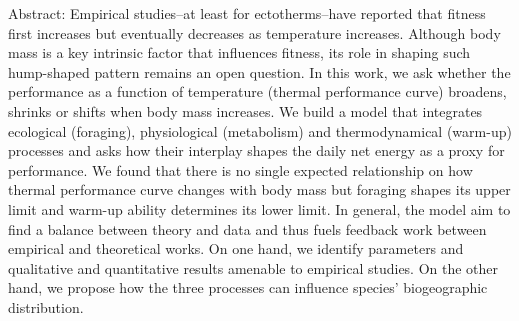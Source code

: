 \noindent
Abstract: Empirical studies--at least for ectotherms--have reported that fitness first increases but eventually decreases as temperature increases.
Although body mass is a key intrinsic factor that influences fitness, its role in shaping such hump-shaped pattern remains an open question.
In this work, we ask whether the performance as a function of temperature (thermal performance curve) broadens, shrinks or shifts when body mass increases.
We build a model that integrates ecological (foraging), physiological (metabolism) and thermodynamical (warm-up) processes and asks how their interplay shapes the daily net energy as a proxy for performance.
We found that there is no single expected relationship on how thermal performance curve changes with body mass but foraging shapes its upper limit and warm-up ability determines its lower limit.
In general, the model aim to find a balance between theory and data and thus fuels feedback work between  empirical and theoretical works.
On one hand, we identify parameters and qualitative and quantitative results amenable to empirical studies.
On the other hand, we propose how the three processes can influence species' biogeographic distribution.
